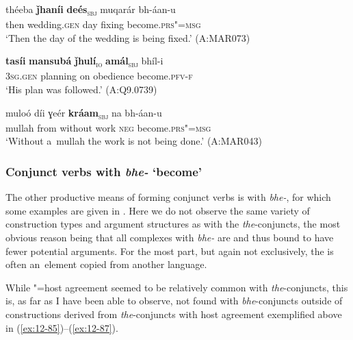 \begin{exe}
\ex
\label{ex:12-85}
\gll théeba {\ob}\textbf{ǰhaníi} \textbf{deés}{\cb}\textsubscript{\textsc{\upshape sbj}} muqarár bh-áan-u\\
then wedding.\textsc{gen} day fixing become.\textsc{prs"=msg} \\
\glt `Then the day of the wedding is being fixed.' (A:MAR073)
\end{exe}
\begin{exe}
\ex
\label{ex:12-86}
\gll {\ob}\textbf{tasíi} \textbf{mansubá} \textbf{ǰhulí}{\cb}\textsubscript{\textsc{\upshape io}} {\ob}\textbf{amál}{\cb}\textsubscript{\textsc{\upshape sbj}} bhíl-i\\
\textsc{3sg.gen} planning on obedience become.\textsc{pfv-f}\\
\glt `His plan was followed.' (A:Q9.0739)
\end{exe}
\begin{exe}
\ex
\label{ex:12-87}
\gll muloó díi ɣeér {\ob}\textbf{kráam}{\cb}\textsubscript{\textsc{\upshape sbj}} na bh-áan-u\\
mullah from without work \textsc{neg} become.\textsc{prs"=msg}\\
\glt `Without a~mullah the work is not being done.' (A:MAR043)
\end{exe}

\subsubsection*{Conjunct verbs with \textit{bhe-} `become'}

The other productive means of forming conjunct verbs is with \textit{bhe-}, for which some examples are given in . Here we do not observe the same variety of construction types and argument structures as with the \textit{the}-conjuncts, the most obvious reason being that all complexes with \textit{bhe-} are  and thus bound to have fewer potential arguments. For the most part, but again not exclusively, the  is often an~element copied from another language. 


While "=host agreement seemed to be relatively common with \textit{the}-conjuncts, this is, as far as I have been able to observe, not found with \textit{bhe}-conjuncts outside of  constructions derived from \textit{the}-conjuncts with host agreement exemplified above in (\ref{ex:12-85})--(\ref{ex:12-87}). 


